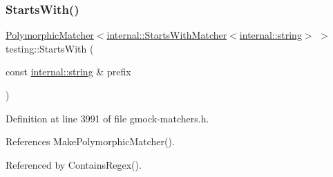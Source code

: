 \subsubsection{\texorpdfstring{Starts\+With()}{StartsWith()}}
{\footnotesize\ttfamily \hyperlink{classtesting_1_1PolymorphicMatcher}{Polymorphic\+Matcher}$<$\hyperlink{classtesting_1_1internal_1_1StartsWithMatcher}{internal\+::\+Starts\+With\+Matcher}$<$\hyperlink{namespacetesting_1_1internal_a8e8ff5b11e64078831112677156cb111}{internal\+::string}$>$ $>$ testing\+::\+Starts\+With (\begin{DoxyParamCaption}\item[{const \hyperlink{namespacetesting_1_1internal_a8e8ff5b11e64078831112677156cb111}{internal\+::string} \&}]{prefix }\end{DoxyParamCaption})\hspace{0.3cm}{\ttfamily [inline]}}



Definition at line 3991 of file gmock-\/matchers.\+h.



References Make\+Polymorphic\+Matcher().



Referenced by Contains\+Regex().


